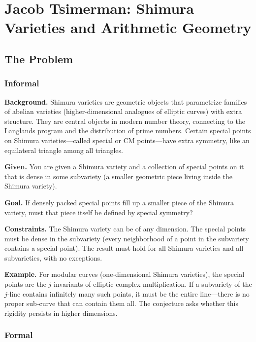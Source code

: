 \let\LocalMacro\relax

\chapter{Jacob Tsimerman: Shimura Varieties and Arithmetic Geometry}

\section{The Problem}

\subsection{Informal}

\textbf{Background.} Shimura varieties are geometric objects that parametrize families of abelian varieties (higher-dimensional analogues of elliptic curves) with extra structure. They are central objects in modern number theory, connecting to the Langlands program and the distribution of prime numbers. Certain special points on Shimura varieties---called special or CM points---have extra symmetry, like an equilateral triangle among all triangles.

\textbf{Given.} You are given a Shimura variety and a collection of special points on it that is dense in some subvariety (a smaller geometric piece living inside the Shimura variety).

\textbf{Goal.} If densely packed special points fill up a smaller piece of the Shimura variety, must that piece itself be defined by special symmetry?

\textbf{Constraints.} The Shimura variety can be of any dimension. The special points must be dense in the subvariety (every neighborhood of a point in the subvariety contains a special point). The result must hold for all Shimura varieties and all subvarieties, with no exceptions.

\textbf{Example.} For modular curves (one-dimensional Shimura varieties), the special points are the $j$-invariants of elliptic complex multiplication. If a subvariety of the $j$-line contains infinitely many such points, it must be the entire line---there is no proper sub-curve that can contain them all. The conjecture asks whether this rigidity persists in higher dimensions.

\subsection{Formal}


